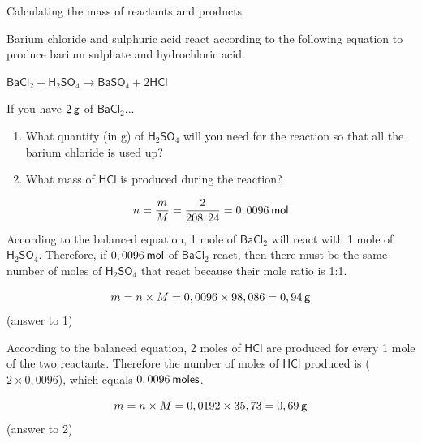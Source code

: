       \begin{wex}{ Calculating the mass of reactants and products }
{
      \label{m38717*id279063}Barium chloride and sulphuric acid react according to the following equation to produce barium sulphate and hydrochloric acid.\par 
      \label{m38717*id279070}
        ${\mathsf{BaCl}}_{2}+{\mathsf{H}}_{2}{\mathsf{SO}}_{4}\to {\mathsf{BaSO}}_{4}+2\mathsf{HCl}$
      \par 
      \label{m38717*id279141}If you have $2\phantom{\rule{2pt}{0ex}}\mathsf{g}$ of $\mathsf{BaCl}{}_{2}$...\par 
      \label{m38717*id279158}\begin{enumerate}[noitemsep, label=\textbf{\arabic*}. ] 
            \label{m38717*uid37}\item What quantity (in g) of $\mathsf{H}{}_{2}\mathsf{SO}{}_{4}$ will you need for the reaction so that all the barium chloride is used up?
\label{m38717*uid38}\item What mass of $\mathsf{HCl}$ is produced during the reaction?
\end{enumerate}
      \vspace{5pt}
}
{
        
    \begin{equation}
    n=\frac{m}{M}=\frac{2}{208,24}=0,0096\phantom{\rule{2pt}{0ex}}\mathsf{mol}
      \end{equation}
      \label{m38717*id279344}According to the balanced equation, 1 mole of $\mathsf{BaCl}{}_{2}$ will react with 1 mole of $\mathsf{H}{}_{2}\mathsf{SO}{}_{4}$. Therefore, if $0,0096\phantom{\rule{2pt}{0ex}}\mathsf{mol}$ of $\mathsf{BaCl}{}_{2}$ react, then there must be the same number of moles of $\mathsf{H}{}_{2}\mathsf{SO}{}_{4}$ that react because their mole ratio is 1:1.\par 
      \label{m38717*id279456}\nopagebreak\noindent{}
        
    \begin{equation}
    m=n\ensuremath{\times}M=0,0096\ensuremath{\times}98,086=0,94\phantom{\rule{2pt}{0ex}}\mathsf{g}
      \end{equation}
      \label{m38717*id279505}(answer to 1)\par 
      \label{m38717*id279513}According to the balanced equation, 2 moles of $\mathsf{HCl}$ are produced for every 1 mole of the two reactants. Therefore the number of moles of $\mathsf{HCl}$ produced is ($2\ensuremath{\times}0,0096$), which equals $0,0096\phantom{\rule{2pt}{0ex}}\mathsf{moles}$.\par 
      \label{m38717*id279531}\nopagebreak\noindent{}
        
    \begin{equation}
    m=n\ensuremath{\times}M=0,0192\ensuremath{\times}35,73=0,69\phantom{\rule{2pt}{0ex}}\mathsf{g}
      \end{equation}
      \label{m38717*id279580}(answer to 2)\par 
}
    \end{wex}
